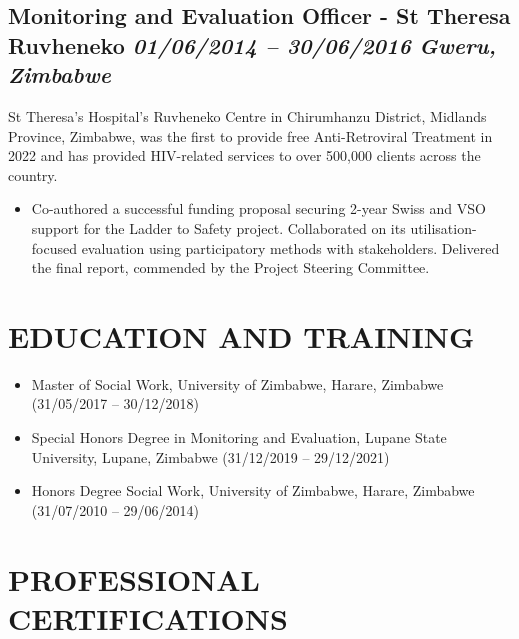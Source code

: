 \documentclass[
  10pt,
]{article}
\providecommand{\tightlist}{%
  \setlength{\itemsep}{0pt}\setlength{\parskip}{0pt}}
\begin{document}
\subsection{\texorpdfstring{Monitoring and Evaluation Officer - St Theresa Ruvheneko \emph{01/06/2014 -- 30/06/2016} \textbar{} \emph{Gweru, Zimbabwe}}{Monitoring and Evaluation Officer - St Theresa Ruvheneko 01/06/2014 -- 30/06/2016 \textbar{} Gweru, Zimbabwe}}\label{monitoring-and-evaluation-officer---st-theresa-ruvheneko-01062014-30062016-gweru-zimbabwe}

St Theresa’s Hospital's Ruvheneko Centre in Chirumhanzu District, Midlands Province, Zimbabwe, was the first to provide free Anti-Retroviral Treatment in 2022 and has provided HIV-related services to over 500,000 clients across the country. 

\begin{itemize}
\tightlist
\item
Co-authored a successful funding proposal securing 2-year Swiss and VSO support for the Ladder to Safety project. Collaborated on its utilisation-focused evaluation using participatory methods with stakeholders. Delivered the final report, commended by the Project Steering Committee.
\end{itemize}

\vspace{0.5cm}


\section{EDUCATION AND TRAINING}\label{education-and-training}

\begin{itemize}[itemsep=0.25em, topsep=0.25em]

\item Master of Social Work, University of Zimbabwe, Harare, Zimbabwe (31/05/2017 – 30/12/2018)

\item Special Honors Degree in Monitoring and Evaluation, Lupane State University, Lupane, Zimbabwe (31/12/2019 – 29/12/2021) 
  
\item Honors Degree Social Work, University of Zimbabwe, Harare, Zimbabwe (31/07/2010 – 29/06/2014)
\end{itemize}

\vspace{0.5cm}

\section{PROFESSIONAL CERTIFICATIONS}\label{professional-certifications}
\end{document}
